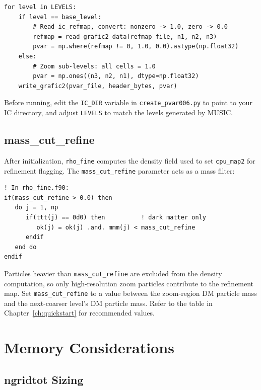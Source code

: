 \documentclass[11pt,fleqn]{book}
\begin{document}
\begin{codebox}
\begin{lstlisting}[style=bash,numbers=none]
for level in LEVELS:
    if level == base_level:
        # Read ic_refmap, convert: nonzero -> 1.0, zero -> 0.0
        refmap = read_grafic2_data(refmap_file, n1, n2, n3)
        pvar = np.where(refmap != 0, 1.0, 0.0).astype(np.float32)
    else:
        # Zoom sub-levels: all cells = 1.0
        pvar = np.ones((n3, n2, n1), dtype=np.float32)
    write_grafic2(pvar_file, header_bytes, pvar)
\end{lstlisting}
\end{codebox}

\begin{infobox}
Before running, edit the \texttt{IC\_DIR} variable in \texttt{create\_pvar006.py} to point to your IC directory, and adjust \texttt{LEVELS} to match the levels generated by MUSIC.
\end{infobox}

\subsection{mass\_cut\_refine}

After initialization, \texttt{rho\_fine} computes the density field used to set \texttt{cpu\_map2} for refinement flagging. The \texttt{mass\_cut\_refine} parameter acts as a mass filter:

\begin{lstlisting}[style=fortran,numbers=none]
! In rho_fine.f90:
if(mass_cut_refine > 0.0) then
   do j = 1, np
      if(ttt(j) == 0d0) then          ! dark matter only
         ok(j) = ok(j) .and. mmm(j) < mass_cut_refine
      endif
   end do
endif
\end{lstlisting}

Particles heavier than \texttt{mass\_cut\_refine} are excluded from the density computation, so only high-resolution zoom particles contribute to the refinement map. Set \texttt{mass\_cut\_refine} to a value between the zoom-region DM particle mass and the next-coarser level's DM particle mass. Refer to the table in Chapter~\ref{ch:quickstart} for recommended values.


\section{Memory Considerations}

\subsection{ngridtot Sizing}
\end{document}
